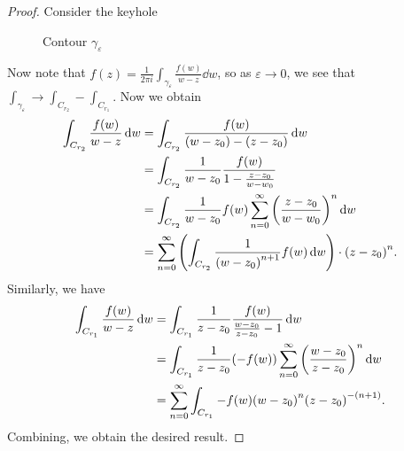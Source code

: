 \documentclass[leqno, openany]{memoir}
\theoremstyle{definition}
\theoremstyle{remark}
\theoremstyle{plain}
\theoremstyle{definition}
\theoremstyle{remark}
\newcommand{\ep}{\varepsilon}
\begin{document}
\begin{proof} Consider the keyhole \begin{figure}[H] \begin{center}
     \end{center} \caption{Contour $\gamma_{\ep}$}%
\end{figure} Now note that $f(z) = \frac{1}{2 \pi i} \int_{\gamma_{\ep}}
\frac{f(w)}{w-z} \dd{w}$, so as $\ep \to 0$, we see that $\int_{\gamma_{\ep}}
\to \int_{C_{r_2}} - \int_{C_{r_1}}$. Now we obtain \begin{align*}
    \int_{C_{r_2}} \frac{f(w)}{w-z} \dd{w} &= \int_{C_{r_2}}
    \frac{f(w)}{(w-z_0) - (z-z_0)} \dd{w} \\ &= \int_{C_{r_2}} \frac{1}{w-z_0}
    \frac{f(w)}{1 - \frac{z-z_0}{w-w_0}} \\ &= \int_{C_{r_2}} \frac{1}{w-z_0}
    f(w) \sum_{n=0}^{\infty} {\qty(\frac{z-z_0}{w-w_0})}^n \dd{w} \\ &=
    \sum_{n=0}^{\infty} \qty(\int_{C_{r_2}} \frac{1}{{(w-z_0)}^{n+1}} f(w)
    \dd{w}) \cdot {(z-z_0)}^n.  \end{align*} Similarly, we have \begin{align*}
    \int_{C_{r_1}} \frac{f(w)}{w-z} \dd{w} &= \int_{C_{r_1}} \frac{1}{z-z_0}
    \frac{f(w)}{\frac{w-z_0}{z-z_0}-1} \dd{w} \\ &= \int_{C_{r_1}}
    \frac{1}{z-z_0} (-f(w)) \sum_{n=0}^{\infty} {\qty(\frac{w-z_0}{z-z_0})}^n
    \dd{w} \\ &= \sum_{n=0}^{\infty} \int_{C_{r_1}} -f(w) {(w-z_0)}^n
{(z-z_0)}^{-(n+1)}.  \end{align*} Combining, we obtain the desired result.
\end{proof}
\end{document}
